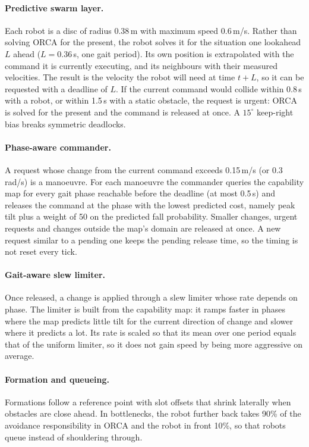 \paragraph{Predictive swarm layer.} Each robot is a disc of radius 0.38\,m with maximum speed 0.6\,m/s.
Rather than solving ORCA for the present, the robot solves it for the situation one lookahead $L$ ahead
($L = 0.36$\,s, one gait period). Its own position is extrapolated with the command it is currently executing,
and its neighbours with their measured velocities. The result is the velocity the robot will need at time
$t + L$, so it can be requested with a deadline of $L$. If the current command would collide within 0.8\,s
with a robot, or within 1.5\,s with a static obstacle, the request is urgent: ORCA is solved for the present
and the command is released at once. A $15^\circ$ keep-right bias breaks symmetric deadlocks.

\paragraph{Phase-aware commander.} A request whose change from the current command exceeds 0.15\,m/s
(or 0.3\,rad/s) is a manoeuvre. For each manoeuvre the commander queries the capability map for every gait
phase reachable before the deadline (at most 0.5\,s) and releases the command at the phase with the lowest
predicted cost, namely peak tilt plus a weight of 50 on the predicted fall probability. Smaller changes,
urgent requests and changes outside the map's domain are released at once. A new request similar to a pending
one keeps the pending release time, so the timing is not reset every tick.

\paragraph{Gait-aware slew limiter.} Once released, a change is applied through a slew limiter whose rate
depends on phase. The limiter is built from the capability map: it ramps faster in phases where the map
predicts little tilt for the current direction of change and slower where it predicts a lot. Its rate is
scaled so that its mean over one period equals that of the uniform limiter, so it does not gain speed by
being more aggressive on average.

\paragraph{Formation and queueing.} Formations follow a reference point with slot offsets that shrink
laterally when obstacles are close ahead. In bottlenecks, the robot further back takes 90\% of the avoidance
responsibility in ORCA and the robot in front 10\%, so that robots queue instead of shouldering through.

